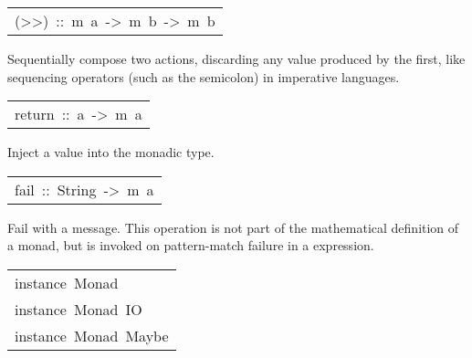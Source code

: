 \begin{haddockdesc}
\begin{haddockdesc}
\end{haddockdesc}
\begin{haddockdesc}
\item[\begin{tabular}{@{}l}
(>>)\ ::\ m\ a\ ->\ m\ b\ ->\ m\ b
\end{tabular}]\haddockbegindoc
Sequentially compose two actions, discarding any value produced
 by the first, like sequencing operators (such as the semicolon)
 in imperative languages.
\par

\end{haddockdesc}
\begin{haddockdesc}
\item[\begin{tabular}{@{}l}
return\ ::\ a\ ->\ m\ a
\end{tabular}]\haddockbegindoc
Inject a value into the monadic type.
\par

\end{haddockdesc}
\begin{haddockdesc}
\item[\begin{tabular}{@{}l}
fail\ ::\ String\ ->\ m\ a
\end{tabular}]\haddockbegindoc
Fail with a message.  This operation is not part of the
 mathematical definition of a monad, but is invoked on pattern-match
 failure in a  expression.
\par

\end{haddockdesc}
\end{haddockdesc}
\begin{haddockdesc}
\item[\begin{tabular}{@{}l}
instance\ Monad\ {\char 91}{\char 93}\\instance\ Monad\ IO\\instance\ Monad\ Maybe
\end{tabular}]
\end{haddockdesc}
